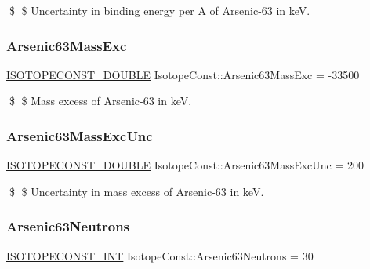 \$ \$ Uncertainty in binding energy per A of Arsenic-\/63 in keV. \mbox{\label{group___isotope_const-_arsenic-_as63_ga133056d432613622d8f0c2b37d52c046}} 
\subsubsection{\texorpdfstring{Arsenic63\+Mass\+Exc}{Arsenic63MassExc}}
{\footnotesize\ttfamily \mbox{\hyperlink{group___isotope_const-_macros_ga8f45a7272ce02c0b4c65c44636ed719a}{I\+S\+O\+T\+O\+P\+E\+C\+O\+N\+S\+T\+\_\+\+D\+O\+U\+B\+LE}} Isotope\+Const\+::\+Arsenic63\+Mass\+Exc = -\/33500}

\$ \$ Mass excess of Arsenic-\/63 in keV. \mbox{\label{group___isotope_const-_arsenic-_as63_ga5e3332c1b99d145e8dbe98dcc432a9a5}} 
\subsubsection{\texorpdfstring{Arsenic63\+Mass\+Exc\+Unc}{Arsenic63MassExcUnc}}
{\footnotesize\ttfamily \mbox{\hyperlink{group___isotope_const-_macros_ga8f45a7272ce02c0b4c65c44636ed719a}{I\+S\+O\+T\+O\+P\+E\+C\+O\+N\+S\+T\+\_\+\+D\+O\+U\+B\+LE}} Isotope\+Const\+::\+Arsenic63\+Mass\+Exc\+Unc = 200}

\$ \$ Uncertainty in mass excess of Arsenic-\/63 in keV. \mbox{\label{group___isotope_const-_arsenic-_as63_ga74b8f901df5f9ea654972f67cc44ff0b}} 
\subsubsection{\texorpdfstring{Arsenic63\+Neutrons}{Arsenic63Neutrons}}
{\footnotesize\ttfamily \mbox{\hyperlink{group___isotope_const-_macros_ga5f18360b3e99483a35c32d789e62621c}{I\+S\+O\+T\+O\+P\+E\+C\+O\+N\+S\+T\+\_\+\+I\+NT}} Isotope\+Const\+::\+Arsenic63\+Neutrons = 30}

